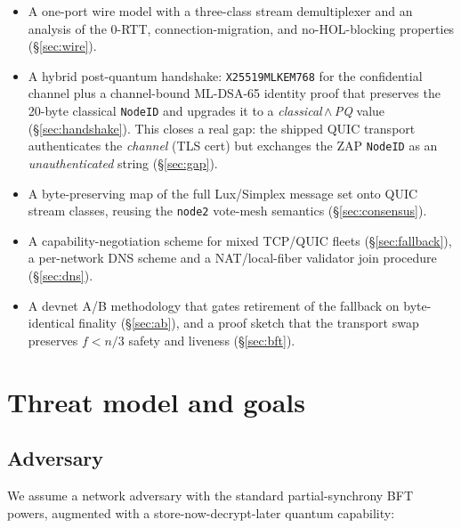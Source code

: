 \documentclass[11pt,a4paper]{article}
\newcommand{\code}[1]{\texttt{#1}}
\begin{document}
\begin{itemize}[nosep]
  \item A one-port wire model with a three-class stream demultiplexer and
        an analysis of the 0-RTT, connection-migration, and
        no-HOL-blocking properties (\S\ref{sec:wire}).
  \item A hybrid post-quantum handshake: \code{X25519MLKEM768} for the
        confidential channel plus a channel-bound ML-DSA-65 identity
        proof that preserves the 20-byte classical \code{NodeID} and
        upgrades it to a \emph{classical\,$\wedge$\,PQ} value
        (\S\ref{sec:handshake}). This closes a real gap: the shipped
        QUIC transport authenticates the \emph{channel} (TLS cert) but
        exchanges the ZAP \code{NodeID} as an \emph{unauthenticated}
        string (\S\ref{sec:gap}).
  \item A byte-preserving map of the full Lux/Simplex message set
        onto QUIC stream classes, reusing the \code{node2} vote-mesh
        semantics (\S\ref{sec:consensus}).
  \item A capability-negotiation scheme for mixed TCP/QUIC fleets
        (\S\ref{sec:fallback}), a per-network DNS scheme and a
        NAT/local-fiber validator join procedure (\S\ref{sec:dns}).
  \item A devnet A/B methodology that gates retirement of the fallback
        on byte-identical finality (\S\ref{sec:ab}), and a proof sketch
        that the transport swap preserves $f<n/3$ safety and liveness
        (\S\ref{sec:bft}).
\end{itemize}

\section{Threat model and goals}\label{sec:threat}

\subsection{Adversary}

We assume a network adversary with the standard partial-synchrony
BFT powers, augmented with a store-now-decrypt-later quantum capability:
\end{document}
